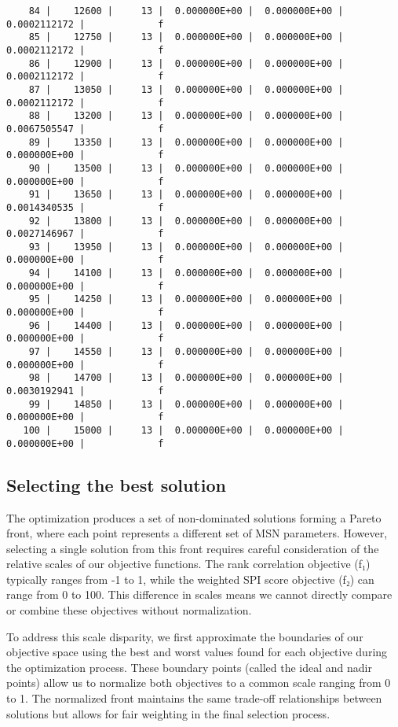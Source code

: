 \documentclass[
  authoryear,
  preprint,
  3p]{elsarticle}
\begin{document}
\begin{verbatim}
    84 |    12600 |     13 |  0.000000E+00 |  0.000000E+00 |  0.0002112172 |             f
    85 |    12750 |     13 |  0.000000E+00 |  0.000000E+00 |  0.0002112172 |             f
    86 |    12900 |     13 |  0.000000E+00 |  0.000000E+00 |  0.0002112172 |             f
    87 |    13050 |     13 |  0.000000E+00 |  0.000000E+00 |  0.0002112172 |             f
    88 |    13200 |     13 |  0.000000E+00 |  0.000000E+00 |  0.0067505547 |             f
    89 |    13350 |     13 |  0.000000E+00 |  0.000000E+00 |  0.000000E+00 |             f
    90 |    13500 |     13 |  0.000000E+00 |  0.000000E+00 |  0.000000E+00 |             f
    91 |    13650 |     13 |  0.000000E+00 |  0.000000E+00 |  0.0014340535 |             f
    92 |    13800 |     13 |  0.000000E+00 |  0.000000E+00 |  0.0027146967 |             f
    93 |    13950 |     13 |  0.000000E+00 |  0.000000E+00 |  0.000000E+00 |             f
    94 |    14100 |     13 |  0.000000E+00 |  0.000000E+00 |  0.000000E+00 |             f
    95 |    14250 |     13 |  0.000000E+00 |  0.000000E+00 |  0.000000E+00 |             f
    96 |    14400 |     13 |  0.000000E+00 |  0.000000E+00 |  0.000000E+00 |             f
    97 |    14550 |     13 |  0.000000E+00 |  0.000000E+00 |  0.000000E+00 |             f
    98 |    14700 |     13 |  0.000000E+00 |  0.000000E+00 |  0.0030192941 |             f
    99 |    14850 |     13 |  0.000000E+00 |  0.000000E+00 |  0.000000E+00 |             f
   100 |    15000 |     13 |  0.000000E+00 |  0.000000E+00 |  0.000000E+00 |             f
\end{verbatim}

\subsection{Selecting the best
solution}\label{selecting-the-best-solution}

The optimization produces a set of non-dominated solutions forming a
Pareto front, where each point represents a different set of MSN
parameters. However, selecting a single solution from this front
requires careful consideration of the relative scales of our objective
functions. The rank correlation objective (f₁) typically ranges from -1
to 1, while the weighted SPI score objective (f₂) can range from 0 to
100. This difference in scales means we cannot directly compare or
combine these objectives without normalization.

To address this scale disparity, we first approximate the boundaries of
our objective space using the best and worst values found for each
objective during the optimization process. These boundary points (called
the ideal and nadir points) allow us to normalize both objectives to a
common scale ranging from 0 to 1. The normalized front maintains the
same trade-off relationships between solutions but allows for fair
weighting in the final selection process.
\end{document}
